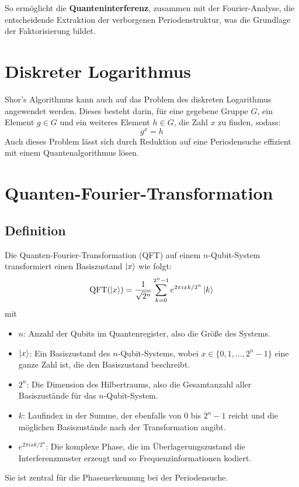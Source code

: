 \noindent So ermöglicht die \textbf{Quanteninterferenz}, zusammen mit der Fourier-Analyse, die entscheidende Extraktion der verborgenen Periodenstruktur, was die Grundlage der Faktorisierung bildet.

\section{Diskreter Logarithmus}

Shor’s Algorithmus kann auch auf das Problem des diskreten Logarithmus angewendet werden. Dieses besteht darin, für eine gegebene Gruppe \( G \), ein Element \( g \in G \) und ein weiteres Element \( h \in G \), die Zahl \( x \) zu finden, sodass:
\[
g^x = h
\]
Auch dieses Problem lässt sich durch Reduktion auf eine Periodensuche effizient mit einem Quantenalgorithmus lösen.

\section{Quanten-Fourier-Transformation}

\subsection{Definition}
Die Quanten-Fourier-Transformation (QFT) auf einem \( n \)-Qubit-System transformiert einen Basiszustand \( \ket{x} \) wie folgt:
\[
\text{QFT}(\ket{x}) = \frac{1}{\sqrt{2^n}} \sum_{k=0}^{2^n-1} e^{2\pi i xk / 2^n} \ket{k}
\]
mit
\begin{itemize}
    \item \( n \): Anzahl der Qubits im Quantenregister, also die Größe des Systems.
    \item \( \ket{x} \): Ein Basiszustand des \( n \)-Qubit-Systems, wobei \( x \in \{0, 1, \ldots, 2^n - 1\} \) eine ganze Zahl ist, die den Basiszustand beschreibt.
    \item \( 2^n \): Die Dimension des Hilbertraums, also die Gesamtanzahl aller Basiszustände für das \( n \)-Qubit-System.
    \item \( k \): Laufindex in der Summe, der ebenfalls von 0 bis \( 2^n - 1 \) reicht und die möglichen Basiszustände nach der Transformation angibt.
    \item \( e^{2 \pi i x k / 2^n} \): Die komplexe Phase, die im Überlagerungszustand die Interferenzmuster erzeugt und so Frequenzinformationen kodiert.
\end{itemize}

\noindent Sie ist zentral für die Phasenerkennung bei der Periodensuche.

